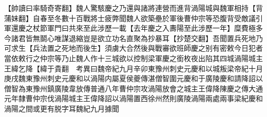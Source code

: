 【帥讀曰率騎奇寄翻】魏人驚駭慶之乃還與諸將連營而進背渦陽城與魏軍相持【背蒲妹翻】自春至冬數十百戰將士疲弊聞魏人欲築壘於軍後曹仲宗等恐腹背受敵議引軍還慶之杖節軍門曰共來至此涉歷一載【去年慶之入夀陽至此涉歷一年】糜費極多今諸君皆無鬬心唯謀退縮豈是欲立功名直聚為抄暴耳【抄楚交翻】吾聞置兵死地乃可求生【兵法置之死地而後生】須虜大合然後與戰審欲班師慶之别有密敕今日犯者當依敕行之仲宗等乃止魏人作十三城欲以控制梁軍慶之銜枚夜出陷其四城渦陽城主王緯乞降【緯于貴翻　考異曰魏帝紀九月辛卯東豫州刺史元慶和以城叛梁帝紀十月庚戌魏東豫州刺史元慶和以渦陽内屬夏侯夔傳湛僧智圍元慶和于廣陵慶和請降詔以僧智為東豫州鎮廣陵韋放傳普通八年曹仲宗攻渦陽放會之城主王偉降陳慶之傳大通元年隸曹仲宗伐渦陽城主王偉降詔以渦陽置西徐州然則廣陵渦陽兩處兩事梁紀慶和渦陽之間或更有脱字耳魏紀九月據聞